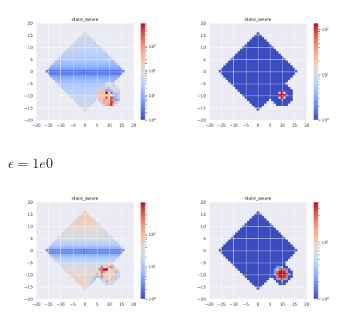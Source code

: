 \documentclass{article}
\begin{document}
\begin{figure}[H]
\ContinuedFloat
    \centering
    \begin{subfigure}[b]{\textwidth}
        \centering
        \includegraphics[width=0.49\textwidth]{img/epsilon/1e0/updates_state_aware.pdf}
        \includegraphics[width=0.49\textwidth]{img/epsilon/1e0/occupations_state_aware.pdf}
        \caption{$\epsilon=1e0$}
    \end{subfigure}
    \begin{subfigure}[b]{\textwidth}
        \centering
        \includegraphics[width=0.49\textwidth]{img/epsilon/1e1/updates_state_aware.pdf}
        \includegraphics[width=0.49\textwidth]{img/epsilon/1e1/occupations_state_aware.pdf}

\end{subfigure}
\end{figure}
\end{document}
